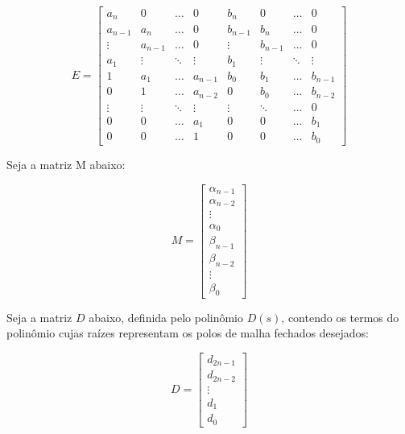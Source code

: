 \documentclass[conference,harvard,brazil,english]{sbatex}
\begin{document}
            \begin{equation}
                \label{mat:sylvester}
                E = 
                \begin{bmatrix}
                a_n & 0 & \dots & 0 & b_n & 0 & \dots & 0 \\
                a_{n-1} & a_n & \dots & 0 & b_{n-1} & b_n & \dots & 0 \\
                \vdots & a_{n-1} & \dots & 0 & \vdots & b_{n-1} & \dots & 0 \\
                a_1 & \vdots & \ddots & \vdots & b_1 & \vdots & \ddots & \vdots \\
                1 & a_1 & \dots & a_{n-1} & b_0 & b_1 & \dots & b_{n-1} \\
                0 & 1 & \dots & a_{n-2} & 0 & b_0 & \dots & b_{n-2} \\
                \vdots & \vdots & \ddots & \vdots & \vdots & \ddots & \dots & 0 \\
                0 & 0 & \dots & a_1 & 0 & 0 & \dots & b_1 \\
                0 & 0 & \dots & 1 & 0 & 0 & \dots & b_0
                \end{bmatrix}
            \end{equation}
            
            Seja a matriz M abaixo:
            
            \begin{equation}
                M = \begin{bmatrix}
                \alpha_{n-1} \\ \alpha_{n-2} \\ \vdots \\ \alpha_{0} \\ \beta_{n-1} \\ \beta_{n-2} \\ \vdots \\ \beta_{0}
                \end{bmatrix}
            \end{equation}
            
            Seja a matriz $D$ abaixo, definida pelo polinômio $D(s)$, contendo os termos do polinômio cujas raízes representam os polos de malha fechados desejados:
            
            \begin{equation}
            \label{mat:D}
                D = \begin{bmatrix}
                d_{2n-1} \\ d_{2n-2} \\ \vdots \\ d_1 \\ d_0
                \end{bmatrix}
            \end{equation}
        
\end{document}
